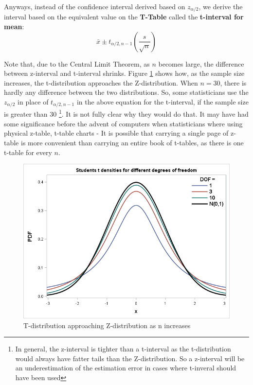 Anyways, instead of the confidence interval derived based on $z_{\alpha/2}$, we derive the interval based on the equivalent value on the \textbf{T-Table} called the \textbf{t-interval for mean}:
	\[ \bar{x}\pm t_{\alpha/2,n-1}\left(\dfrac{s}{\sqrt{n}}\right) \]
	
Note that, due to the Central Limit Theorem, as $n$ becomes large, the difference between z-interval and t-interval shrinks. Figure \ref{fig:T-Z-distributions} shows how, as the sample size increases, the t-distribution approaches the Z-distribution. When $n=30$, there is hardly any difference between the two distributions. So, some statisticians use the \(z_{\alpha/2}\) in place of \(  t_{\alpha/2,n-1} \) in the above equation for the t-interval,  if the sample size is greater than 30 \footnote{In general, the z-interval is tighter than a t-interval as the t-distribution would always have fatter tails than the Z-distribution. So a z-interval will be an underestimation of the estimation error in cases where t-inveral should have been used}. It is not fully clear why they would do that. It may have had some significance before the advent of computers when statisticians where using physical z-table, t-table charts - It is possible that carrying a single page of z-table is more convenient than carrying an entire book of t-tables, as there is one t-table for every $n$. 
	\begin{figure}
	  \centering
	    \includegraphics[width=\textwidth]{Statistics/T-Z-distributions}
	  \caption{T-distribution approaching Z-distribution as n increases}
	  \label{fig:T-Z-distributions}
	\end{figure}
	
